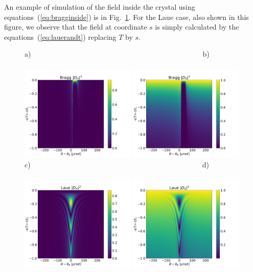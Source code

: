 \documentclass[preprint]{iucr}              %
\begin{document}
An example of simulation of the field inside the crystal using equations~(\ref{eq:bragginside}) is in Fig.~\ref{fig:braggMap}. For the Laue case, also shown in this figure, we observe that the field at coordinate $s$ is simply calculated by the equations~(\ref{eq:lauerandt}) replacing $T$ by $s$.

\begin{figure}\label{fig:braggMap}
    \centering
    a)~~~~~~~~~~~~~~~~~~~~~~~~~~~~~~~~~~~~~~~~~~~~~~~~b)~~~~~~~~~~~~~~~~~~~~~~~~~~~~~~~~~~~~~~~~~~\\
    \includegraphics[width=0.49\textwidth]{figures/Bragg_DH.png}
    \includegraphics[width=0.49\textwidth]{figures/Bragg_D0.png}
    c)~~~~~~~~~~~~~~~~~~~~~~~~~~~~~~~~~~~~~~~~~~~~~~~~d)~~~~~~~~~~~~~~~~~~~~~~~~~~~~~~~~~~~~~~~~~\\
    \includegraphics[width=0.49\textwidth]{figures/Laue_DH.png}
    \includegraphics[width=0.49\textwidth]{figures/Laue_D0.png}

\end{figure}
\end{document}
